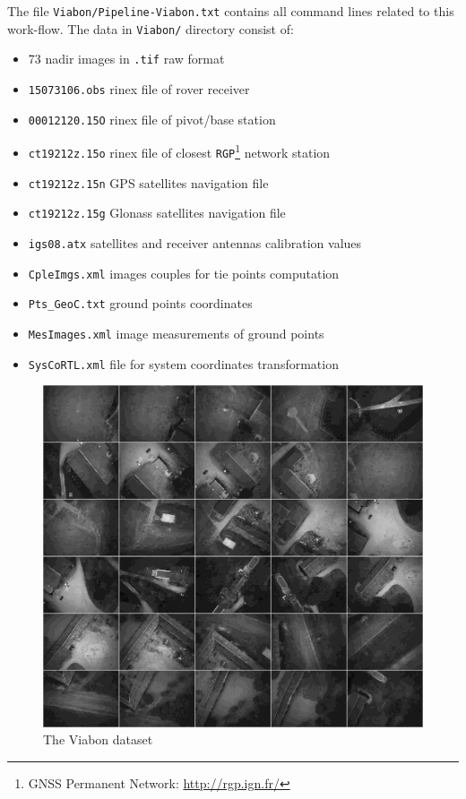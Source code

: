The file {\tt Viabon/Pipeline-Viabon.txt} contains all command lines related to this work-flow. The data in {\tt Viabon/} directory consist of:
\newline
\begin{itemize}
\item 73 nadir images in {\tt .tif} raw format
\item {\tt 15073106.obs} rinex file of rover receiver
\item {\tt 00012120.15O} rinex file of pivot/base station
\item {\tt ct19212z.15o} rinex file of closest {\tt RGP}\footnote{GNSS Permanent Network: \url{http://rgp.ign.fr/}} network station
\item {\tt ct19212z.15n} GPS satellites navigation file
\item {\tt ct19212z.15g} Glonass satellites navigation file
\item {\tt igs08.atx} satellites and receiver antennas calibration values
\item {\tt CpleImgs.xml} images couples for tie points computation
\item {\tt Pts\_GeoC.txt} ground points coordinates
\item {\tt MesImages.xml} image measurements of ground points
\item {\tt SysCoRTL.xml} file for system coordinates transformation 
\end{itemize}

\begin{figure}[H]
    \begin{center}
    \setlength{\unitlength}{0.5cm}
    \includegraphics[width=0.5\linewidth]{FIGS/Viabon/panel.jpg}
    \end{center}
    \caption{The Viabon dataset}
    \label{fig:iris}
\end{figure}

